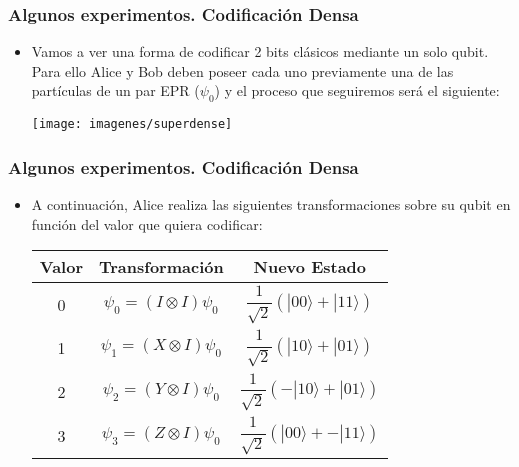 \documentclass{beamer}
\newcommand{\base}[1]{|#1\rangle}
\begin{document}
\begin{frame}
	\frametitle{Algunos experimentos. Codificación Densa}
	\begin{itemize}
	\item Vamos a ver una forma de codificar 2 bits clásicos mediante un solo qubit. Para ello Alice y Bob deben poseer cada uno previamente una de las partículas de un par EPR ($\psi_0$) y el proceso que seguiremos será el siguiente:
	\begin{center}
	\texttt{[image: imagenes/superdense]}\\
	\end{center}
	\end{itemize}
\end{frame}

\begin{frame}
	\frametitle{Algunos experimentos. Codificación Densa}
	\begin{itemize}
	\item A continuación, Alice realiza las siguientes transformaciones sobre su qubit en función del valor que quiera codificar:
	
	\begin{center}
 		\begin{tabular}{||c c c||} 
 		\hline
 		Valor & Transformación & Nuevo Estado \\ [0.8ex] 
	 	\hline\hline
 		0 & $\psi_0 = (I \otimes I)\psi_0$ &  $\dfrac{1}{\sqrt{2}}(\base{00} + \base{11})$ \\ 
 		\hline
	 	1 & $\psi_1 = (X \otimes I)\psi_0$ &  $\dfrac{1}{\sqrt{2}}(\base{10} + \base{01})$  \\
 		\hline
	 	2 & $\psi_2 = (Y \otimes I)\psi_0$ &  $\dfrac{1}{\sqrt{2}}(-\base{10} + \base{01})$  \\
	 	\hline
	 	3 & $\psi_3 = (Z \otimes I)\psi_0$ &  $\dfrac{1}{\sqrt{2}}(\base{00} + -\base{11})$ \\[1ex]
	 	\hline
		\end{tabular}
	\end{center}
	\end{itemize}
\end{frame}
\end{document}
